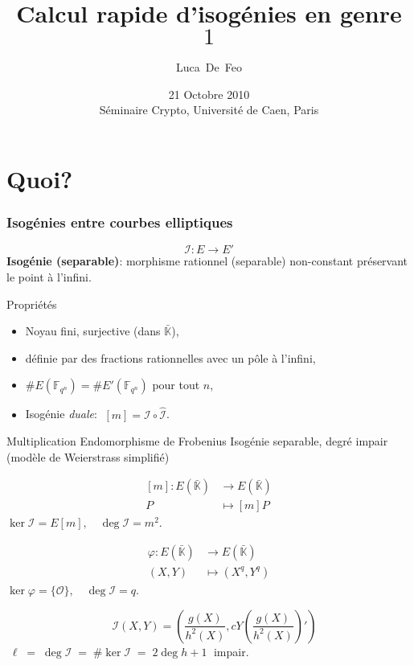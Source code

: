 \documentclass[10pt]{beamer}
\title{Calcul rapide d'isogénies en genre $1$}
\author{Luca~De~Feo}
\institute[INRIA Saclay]{INRIA Saclay, Projet TANC}
\date[Caen, 21 Octobre 2010]{21 Octobre 2010\\Séminaire Crypto, Université de Caen, Paris}
\newcommand{\clot}[1]{\bar{#1}}  %
\newcommand{\card}[1]{\# #1}  %
\newcommand{\K}{\mathbb{K}}  %
\newcommand{\F}{\mathbb{F}}  %
\newcommand{\frob}{\varphi}  %
\newcommand{\0}{\mathcal{O}}  %
\newcommand{\isog}[1]{\mathcal{#1}}  %
\newcommand{\I}{\isog{I}}  %
\begin{document}
\begin{frame}
  \titlepage
\end{frame}


\section{Quoi?}

\begin{frame}
  \frametitle{Isogénies entre courbes elliptiques}
  
  \vspace{-2mm}

  {\large \[\I:E\to E'\]}
  \textbf{Isogénie (separable)}: morphisme rationnel (separable)
  non-constant préservant le point à l'infini.
  
  \begin{block}{Propriétés}
    \begin{itemize}
    \item Noyau fini, surjective (dans $\clot{\K}$), 
    \item définie par des fractions rationnelles avec un pôle à l'infini,
    \item $\card{E(\F_{q^n})} = \card{E'(\F_{q^n})}$ pour tout $n$,
    \item Isogénie \emph{duale}: $\;[m] = \I\circ\hat{\I}$.
    \end{itemize}
  \end{block}

  \vspace{-1mm}

  \begin{block}{
	\begin{overprint}
	 Multiplication	
	\onslide<2> Endomorphisme de Frobenius
	\onslide<3> Isogénie separable, degré impair (modèle de Weierstrass simplifié)
	\end{overprint}
      }
    \begin{overprint}
      \[\begin{aligned}
	{}[m] : E(\clot{\K}) &\rightarrow E(\clot{\K})\\
	                   P &\mapsto [m]P
      \end{aligned}\]
      $\ker\I = E[m], \quad\deg\I = m^2$.

      \[\begin{aligned}
	\frob : E(\clot{\K}) &\rightarrow E(\clot{\K})\\
	               (X,Y) &\mapsto (X^q,Y^q)
      \end{aligned}\]
      $\ker\frob = \{\0\}, \quad\deg\I = q$.

      \[\quad\I(X,Y) = \left(\frac{g(X)}{h^2(X)},
      cY\left(\frac{g(X)}{h^2(X)}\right)'\right)\]
      $\;\ell\;=\;\deg\I\;=\;
      \card{\ker\I} \;=\; 2\deg h + 1\;$ impair.
    \end{overprint}
  \end{block}
\end{frame}
\end{document}
